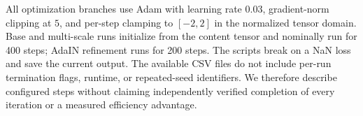 All optimization branches use Adam with learning rate $0.03$, gradient-norm clipping at $5$, and per-step clamping to $[-2,2]$ in the normalized tensor domain. Base and multi-scale runs initialize from the content tensor and nominally run for 400 steps; AdaIN refinement runs for 200 steps. The scripts break on a NaN loss and save the current output. The available CSV files do not include per-run termination flags, runtime, or repeated-seed identifiers. We therefore describe configured steps without claiming independently verified completion of every iteration or a measured efficiency advantage.
